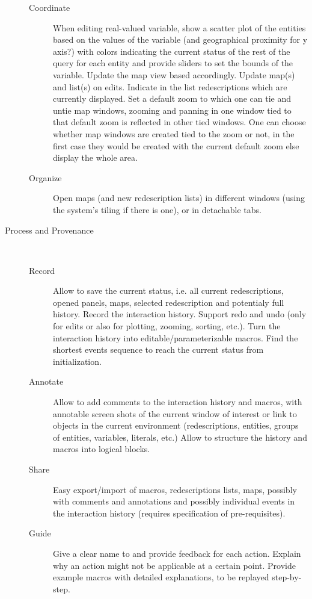 \documentclass{llncs}
\begin{document}
\begin{description}
\begin{description}
\item[Coordinate] When editing real-valued variable, show a scatter plot of the entities based on the values of the variable (and geographical proximity for y axis?) with colors indicating the current status of the rest of the query for each entity and provide sliders to set the bounds of the variable. Update the map view based accordingly. Update map(s) and list(s) on edits. Indicate in the list redescriptions which are currently displayed. Set a default zoom to which one can tie and untie map windows, zooming and panning in one window tied to that default zoom is reflected in other tied windows. One can choose whether map windows are created tied to the zoom or not, in the first case they would be created with the current default zoom else display the whole area.
\item[Organize] Open maps (and new redescription lists) in different windows (using the system's tiling if there is one), or in detachable tabs.
\end{description}
\item[Process and Provenance]~
\begin{description}
\item[Record] Allow to save the current status, i.e. all current redescriptions, opened panels, maps, selected redescription and potentialy full history. Record the interaction history. Support redo and undo (only for edits or also for plotting, zooming, sorting, etc.). Turn the interaction history into editable/parameterizable macros. Find the shortest events sequence to reach the current status from initialization.
\item[Annotate] Allow to add comments to the interaction history and macros, with annotable screen shots of the current window of interest or link to objects in the current environment (redescriptions, entities, groups of entities, variables, literals, etc.) Allow to structure the history and macros into logical blocks. 
\item[Share] Easy export/import of macros, redescriptions lists, maps, possibly with comments and annotations and possibly individual events in the interaction history (requires specification of pre-requisites).
\item[Guide] Give a clear name to and provide feedback for each action. Explain why an action might not be applicable at a certain point. Provide example macros with detailed explanations, to be replayed step-by-step. 
\end{description}
\end{description}
\end{document}
